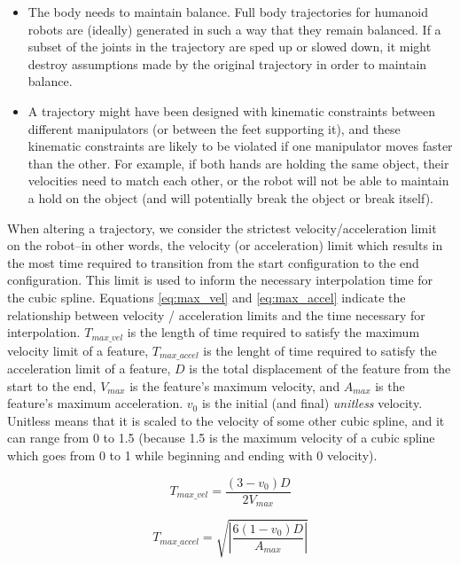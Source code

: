 \documentclass[letterpaper, 10 pt, conference]{ieeeconf}  %
\begin{document}
\begin{itemize}
\item The body needs to maintain balance. Full body trajectories for humanoid robots are (ideally) generated in such a way that they remain balanced. If a subset of the joints in the trajectory are sped up or slowed down, it might destroy assumptions made by the original trajectory in order to maintain balance.
\item A trajectory might have been designed with kinematic constraints between different manipulators (or between the feet supporting it), and these kinematic constraints are likely to be violated if one manipulator moves faster than the other. For example, if both hands are holding the same object, their velocities need to match each other, or the robot will not be able to maintain a hold on the object (and will potentially break the object or break itself).
\end{itemize}

When altering a trajectory, we consider the strictest velocity/acceleration limit on the robot--in other words, the velocity (or acceleration) limit which results in the most time required to transition from the start configuration to the end configuration. This limit is used to inform the necessary interpolation time for the cubic spline. Equations \ref{eq:max_vel} and \ref{eq:max_accel} indicate the relationship between velocity / acceleration limits and the time necessary for interpolation. $T_{max\_vel}$ is the length of time required to satisfy the maximum velocity limit of a feature, $T_{max\_accel}$ is the lenght of time required to satisfy the acceleration limit of a feature, $D$ is the total displacement of the feature from the start to the end, $V_{max}$ is the feature's maximum velocity, and $A_{max}$ is the feature's maximum acceleration. $v_0$ is the initial (and final) \emph{unitless} velocity. Unitless means that it is scaled to the velocity of some other cubic spline, and it can range from 0 to 1.5 (because 1.5 is the maximum velocity of a cubic spline which goes from 0 to 1 while beginning and ending with 0 velocity).

\begin{equation}
    T_{max\_vel} = \frac{(3 - v_{0})D}{2 V_{max}}
    \label{eq:max_vel}
\end{equation}

\begin{equation}
    T_{max\_accel} = \sqrt{ \left| \frac{6(1-v_{0})D}{A_{max}} \right| }
    \label{eq:max_accel}
\end{equation}
\end{document}
